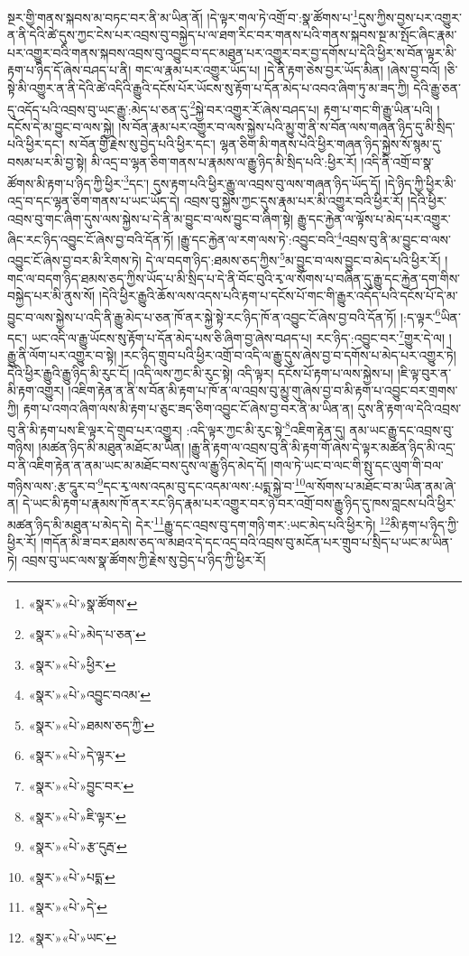 སྔར་གྱི་གནས་སྐབས་མ་བཏང་བར་ནི་མ་ཡིན་ནོ། །དེ་ལྟར་གལ་ཏེ་འགྲོ་བ་:སྣ་ཚོགས་པ་\footnote{«སྣར་»«པེ་»སྣ་ཚོགས་}དུས་ཀྱིས་བྱས་པར་འགྱུར་ན་ནི་དེའི་ཚེ་དུས་ཀྱང་ངེས་པར་འབྲས་བུ་བསྐྱེད་པ་ལ་ཐག་རིང་བར་གནས་པའི་གནས་སྐབས་སྔ་མ་སྤོང་ཞིང་རྣམ་པར་འགྱུར་བའི་གནས་སྐབས་འབྲས་བུ་འབྱུང་བ་དང་མཐུན་པར་འགྱུར་བར་བྱ་དགོས་པ་དེའི་ཕྱིར་ས་བོན་ལྟར་མི་རྟག་པ་ཉིད་དོ་ཞེས་བཤད་པ་ནི། གང་ལ་རྣམ་པར་འགྱུར་ཡོད་པ། །དེ་ནི་རྟག་ཅེས་བྱར་ཡོད་མིན། །ཞེས་བྱ་བའོ། །ཅི་སྟེ་མི་འགྱུར་ན་ནི་དེའི་ཚེ་འདིའི་རྒྱུའི་དངོས་པོར་ཡོངས་སུ་རྟོག་པ་དོན་མེད་པ་འབའ་ཞིག་ཏུ་མ་ཟད་ཀྱི། དེའི་རྒྱུ་ཅན་དུ་འདོད་པའི་འབྲས་བུ་ཡང་རྒྱུ་:མེད་པ་ཅན་དུ་\footnote{«སྣར་»«པེ་»མེད་པ་ཅན་}སྐྱེ་བར་འགྱུར་རོ་ཞེས་བཤད་པ། རྟག་པ་གང་གི་རྒྱུ་ཡིན་པའི། །དངོས་དེ་མ་བྱུང་བ་ལས་སྐྱེ། །ས་བོན་རྣམ་པར་འགྱུར་བ་ལས་སྐྱེས་པའི་མྱུ་གུ་ནི་ས་བོན་ལས་གཞན་ཉིད་དུ་མི་སྲིད་པའི་ཕྱིར་དང་། ས་བོན་གྱི་རྗེས་སུ་བྱེད་པའི་ཕྱིར་དང་། ལྷན་ཅིག་མི་གནས་པའི་ཕྱིར་གཞན་ཉིད་སྐྱེས་སོ་སྙམ་དུ་བསམ་པར་མི་བྱ་སྟེ། མི་འདྲ་བ་ལྷན་ཅིག་གནས་པ་རྣམས་ལ་རྒྱུ་ཉིད་མི་སྲིད་པའི་:ཕྱིར་རོ། །འདི་ནི་འགྲོ་བ་སྣ་ཚོགས་མི་རྟག་པ་ཉིད་ཀྱི་ཕྱིར་\footnote{«སྣར་»«པེ་»ཕྱིར་}དང་། དུས་རྟག་པའི་ཕྱིར་རྒྱུ་ལ་འབྲས་བུ་ལས་གཞན་ཉིད་ཡོད་དོ། །དེ་ཉིད་ཀྱི་ཕྱིར་མི་འདྲ་བ་དང་ལྷན་ཅིག་གནས་པ་ཡང་ཡོད་དེ། འབྲས་བུ་སྐྱེས་ཀྱང་དུས་རྣམ་པར་མི་འགྱུར་བའི་ཕྱིར་རོ། །དེའི་ཕྱིར་འབྲས་བུ་གང་ཞིག་དུས་ལས་སྐྱེས་པ་དེ་ནི་མ་བྱུང་བ་ལས་བྱུང་བ་ཞིག་སྟེ། རྒྱུ་དང་རྐྱེན་ལ་ལྟོས་པ་མེད་པར་འགྱུར་ཞིང་རང་ཉིད་འབྱུང་ངོ་ཞེས་བྱ་བའི་དོན་ཏོ། །རྒྱུ་དང་རྐྱེན་ལ་རག་ལས་ཏེ་:འབྱུང་བའི་\footnote{«སྣར་»«པེ་»འབྱུང་བའམ་}འབྲས་བུ་ནི་མ་བྱུང་བ་ལས་འབྱུང་ངོ་ཞེས་བྱ་བར་མི་རིགས་ཏེ། དེ་ལ་བདག་ཉིད་:ཐམས་ཅད་ཀྱིས་\footnote{«སྣར་»«པེ་»ཐམས་ཅད་ཀྱི་}མ་བྱུང་བ་ལས་བྱུང་བ་མེད་པའི་ཕྱིར་རོ། །གང་ལ་བདག་ཉིད་ཐམས་ཅད་ཀྱིས་ཡོད་པ་མི་སྲིད་པ་དེ་ནི་བོང་བུའི་རྭ་ལ་སོགས་པ་བཞིན་དུ་རྒྱུ་དང་རྐྱེན་དག་གིས་བསྐྱེད་པར་མི་ནུས་སོ། །དེའི་ཕྱིར་རྒྱུའི་ཆོས་ལས་འདས་པའི་རྟག་པ་དངོས་པོ་གང་གི་རྒྱུར་འདོད་པའི་དངོས་པོ་དེ་མ་བྱུང་བ་ལས་སྐྱེས་པ་འདི་ནི་རྒྱུ་མེད་པ་ཅན་ཁོ་ནར་སྐྱེ་སྟེ་རང་ཉིད་ཁོ་ན་འབྱུང་ངོ་ཞེས་བྱ་བའི་དོན་ཏོ། །:ད་ལྟར་\footnote{«སྣར་»«པེ་»དེ་ལྟར་}ཡིན་དང་། ཡང་འདི་ལ་རྒྱུ་ཡོངས་སུ་རྟོག་པ་དོན་མེད་པས་ཅི་ཞིག་བྱ་ཞེས་བཤད་པ། རང་ཉིད་:འབྱུང་བར་\footnote{«སྣར་»«པེ་»བྱུང་བར་}གྱུར་དེ་ལ། །རྒྱུ་ནི་ལོག་པར་འགྱུར་བ་སྟེ། །རང་ཉིད་གྲུབ་པའི་ཕྱིར་འགྲོ་བ་འདི་ལ་རྒྱུ་དུས་ཞེས་བྱ་བ་དགོས་པ་མེད་པར་འགྱུར་ཏེ། དེའི་ཕྱིར་རྒྱུའི་རྒྱུ་ཉིད་མི་རུང་ངོ། །འདི་ལས་ཀྱང་མི་རུང་སྟེ། འདི་ལྟར། དངོས་པོ་རྟག་པ་ལས་སྐྱེས་པ། །ཇི་ལྟ་བུར་ན་མི་རྟག་འགྱུར། །འཇིག་རྟེན་ན་ནི་ས་བོན་མི་རྟག་པ་ཁོ་ན་ལ་འབྲས་བུ་མྱུ་གུ་ཞེས་བྱ་བ་མི་རྟག་པ་འབྱུང་བར་གྲགས་ཀྱི། རྟག་པ་འགའ་ཞིག་ལས་མི་རྟག་པ་ཅུང་ཟད་ཅིག་འབྱུང་ངོ་ཞེས་བྱ་བར་ནི་མ་ཡིན་ན། དུས་ནི་རྟག་ལ་དེའི་འབྲས་བུ་ནི་མི་རྟག་པས་ཇི་ལྟར་དེ་གྲུབ་པར་འགྱུར། :འདི་ལྟར་ཀྱང་མི་རུང་སྟེ་\footnote{«སྣར་»«པེ་»ཇི་ལྟར་}འཇིག་རྟེན་དུ། ནམ་ཡང་རྒྱུ་དང་འབྲས་བུ་གཉིས། །མཚན་ཉིད་མི་མཐུན་མཐོང་མ་ཡིན། །རྒྱུ་ནི་རྟག་ལ་འབྲས་བུ་ནི་མི་རྟག་གོ་ཞེས་དེ་ལྟར་མཚན་ཉིད་མི་འདྲ་བ་ནི་འཇིག་རྟེན་ན་ནམ་ཡང་མ་མཐོང་བས་དུས་ལ་རྒྱུ་ཉིད་མེད་དོ། །གལ་ཏེ་ཡང་བ་ལང་གི་སྤུ་དང་ལུག་གི་བལ་གཉིས་ལས་:རྩ་དཱུར་བ་\footnote{«སྣར་»«པེ་»རྩ་དུརྦ་}དང་རྭ་ལས་འདམ་བུ་དང་འདམ་ལས་:པདྨ་སྐྱེ་བ་\footnote{«སྣར་»«པེ་»པདྨ་}ལ་སོགས་པ་མཐོང་བ་མ་ཡིན་ནམ་ཞེ་ན། དེ་ཡང་མི་རྟག་པ་རྣམས་ཁོ་ནར་རང་ཉིད་རྣམ་པར་འགྱུར་བར་ཉེ་བར་འགྲོ་བས་རྒྱུ་ཉིད་དུ་ཁས་བླངས་པའི་ཕྱིར་མཚན་ཉིད་མི་མཐུན་པ་མེད་དེ། དེར་\footnote{«སྣར་»«པེ་»དེ་}རྒྱུ་དང་འབྲས་བུ་དག་གཉི་གར་:ཡང་མེད་པའི་ཕྱིར་ཏེ། \footnote{«སྣར་»«པེ་»ཡང་}མི་རྟག་པ་ཉིད་ཀྱི་ཕྱིར་རོ། །གདོན་མི་ཟ་བར་ཐམས་ཅད་ལ་མཐའ་དེ་དང་འདྲ་བའི་འབྲས་བུ་མངོན་པར་གྲུབ་པ་སྲིད་པ་ཡང་མ་ཡིན་ཏེ། འབྲས་བུ་ཡང་ལས་སྣ་ཚོགས་ཀྱི་རྗེས་སུ་བྱེད་པ་ཉིད་ཀྱི་ཕྱིར་རོ། 